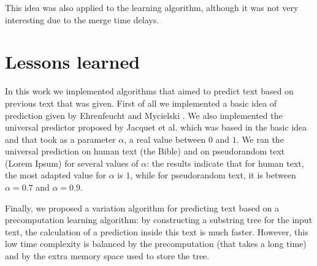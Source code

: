 \documentclass[a4paper,12pt]{article}
\begin{document}
  This idea was also applied to the learning algorithm, although it was not very interesting due to the merge time delays.
  
\section*{Lessons learned}

In this work we implemented algorithms that aimed to predict text based on previous text that was given. First of all we implemented a basic idea of prediction given by Ehrenfeucht and Mycielski \cite{basic_algo}. We also implemented the universal predictor proposed by Jacquet et al. \cite{paper} which was based in the basic idea and that took as a parameter $\alpha$, a real value between $0$ and $1$. We ran the universal prediction on human text (the Bible) and on pseudorandom text (Lorem Ipsum) for several values of $\alpha$: the results indicate that for human text, the most adapted value for $\alpha$ is $1$, while for pseudorandom text, it is between $\alpha=0.7$ and $\alpha=0.9$.

Finally, we proposed a variation algorithm for predicting text based on a precomputation learning algorithm: by constructing a substring tree for the input text, the calculation of a prediction inside this text is much faster. However, this low time complexity is balanced by the precomputation (that takes a long time) and by the extra memory space used to store the tree.



\end{document}
